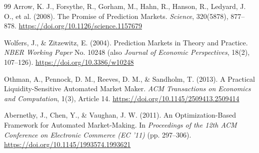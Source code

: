 \documentclass{ledger}
\theoremstyle{plain}
\theoremstyle{remark}
\begin{document}
\begin{thebibliography}{99}
 Arrow, K. J., Forsythe, R., Gorham, M., Hahn, R., Hanson,
R., Ledyard, J. O., et al. (2008). The Promise of Prediction Markets.
\emph{Science}, 320(5878), 877--878. \url{https://doi.org/10.1126/science.1157679}

 Wolfers, J., \& Zitzewitz, E. (2004). Prediction Markets in
Theory and Practice. \emph{NBER Working Paper} No. 10248 (also \emph{Journal of
Economic Perspectives}, 18(2), 107--126). \url{https://doi.org/10.3386/w10248}

 Othman, A., Pennock, D. M., Reeves, D. M., \& Sandholm, T.
(2013). A Practical Liquidity-Sensitive Automated Market Maker. \emph{ACM
Transactions on Economics and Computation}, 1(3), Article 14.
\url{https://doi.org/10.1145/2509413.2509414}

 Abernethy, J., Chen, Y., \& Vaughan, J. W. (2011). An
Optimization-Based Framework for Automated Market-Making. In \emph{Proceedings of
the 12th ACM Conference on Electronic Commerce (EC '11)} (pp. 297--306).
\url{https://doi.org/10.1145/1993574.1993621}

\end{thebibliography}
\end{document}
